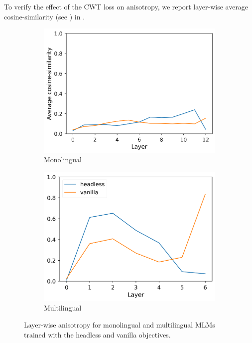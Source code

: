 To verify the effect of the CWT loss on anisotropy, we report layer-wise average cosine-similarity (see ) in .

\begin{figure}[H]
     \centering
     \begin{subfigure}[b]{0.48\columnwidth}
          \includegraphics[width=\linewidth]{sources/part_2/headless/imgs/anisotropy_mono.png}
          \caption{Monolingual}
          \label{fig:cosines_bert}
     \end{subfigure}
     \begin{subfigure}[b]{0.46\columnwidth}
          \includegraphics[width=\linewidth]{sources/part_2/headless/imgs/anisotropy_multi.png}
          \caption{Multilingual}
          \label{fig:cosines_mbert}
     \end{subfigure}
     \caption{Layer-wise anisotropy for monolingual and multilingual MLMs trained with the headless and vanilla objectives.}
     \label{fig:cosine_embs}
 \end{figure}

